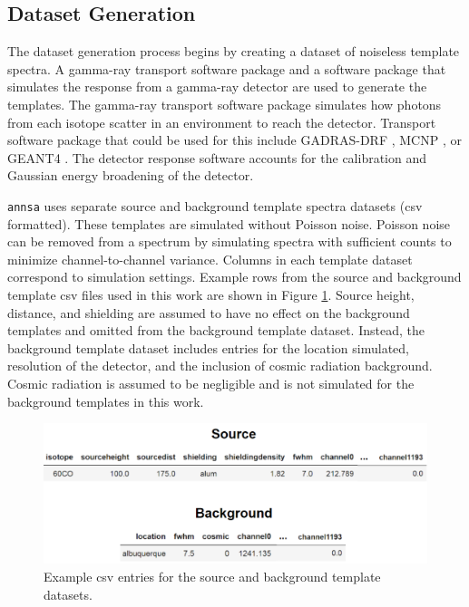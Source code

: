 \subsection{Dataset Generation} \label{section_dataset_gen}

The dataset generation process begins by creating a dataset of noiseless template spectra. A gamma-ray transport software package and a software package that simulates the response from a gamma-ray detector are used to generate the templates. The gamma-ray transport software package simulates how photons from each isotope scatter in an environment to reach the detector. Transport software package that could be used for this include GADRAS-DRF \cite{mitchell2014}, MCNP \cite{Goorley2016}, or GEANT4 \cite{geant4}. The detector response software accounts for the calibration and Gaussian energy broadening of the detector. 

\verb|annsa| uses separate source and background template spectra datasets (csv formatted). These templates are simulated without Poisson noise. Poisson noise can be removed from a spectrum by simulating spectra with sufficient counts to minimize channel-to-channel variance. Columns in each template dataset correspond to simulation settings. Example rows from the source and background template csv files used in this work are shown in Figure \ref{fig:template_csv}. Source height, distance, and shielding are assumed to have no effect on the background templates and omitted from the background template dataset. Instead, the background template dataset includes entries for the location simulated, resolution of the detector, and the inclusion of cosmic radiation background. Cosmic radiation is assumed to be negligible and is not simulated for the background templates in this work.

\begin{figure}[H]
	\centering
	\includegraphics[width=0.8\linewidth]{images/template_csv.png}
	\caption{Example csv entries for the source and background template datasets.}
	\label{fig:template_csv}
\end{figure}


